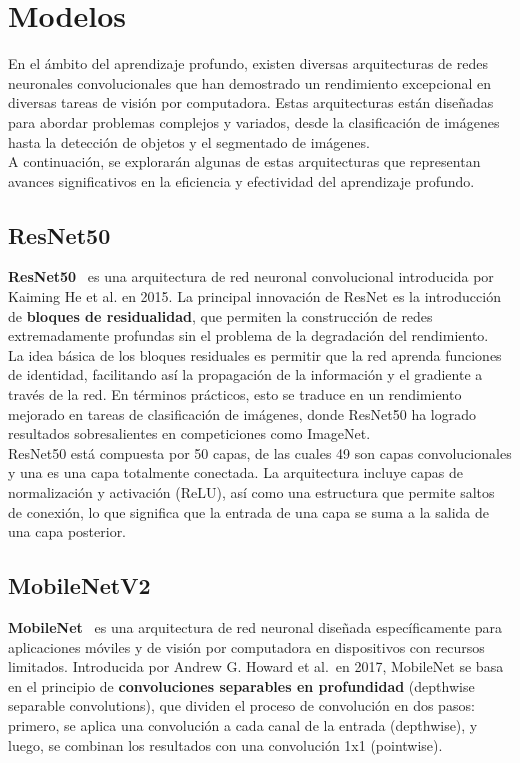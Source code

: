 \section{Modelos}\label{sec:modelos}
En el ámbito del aprendizaje profundo, existen diversas arquitecturas de redes neuronales convolucionales que han
demostrado un rendimiento excepcional en diversas tareas de visión por computadora.
Estas arquitecturas están diseñadas para abordar problemas complejos y variados, desde la clasificación de imágenes
hasta la detección de objetos y el segmentado de imágenes. \\[6pt]

A continuación, se explorarán algunas de estas arquitecturas que representan avances significativos en la eficiencia y
efectividad del aprendizaje profundo.

\subsection{ResNet50}\label{subsec:resnet50}
\textbf{ResNet50}~\cite{resnet} es una arquitectura de red neuronal convolucional introducida por Kaiming He et al. en 2015.
La principal innovación de ResNet es la introducción de \textbf{bloques de residualidad}, que permiten la construcción
de redes extremadamente profundas sin el problema de la degradación del rendimiento. \\[6pt]

La idea básica de los bloques residuales es permitir que la red aprenda funciones de identidad, facilitando así la
propagación de la información y el gradiente a través de la red.
En términos prácticos, esto se traduce en un rendimiento mejorado en tareas de clasificación de imágenes, donde
ResNet50 ha logrado resultados sobresalientes en competiciones como ImageNet. \\[6pt]

ResNet50 está compuesta por 50 capas, de las cuales 49 son capas convolucionales y una es una capa totalmente conectada.
La arquitectura incluye capas de normalización y activación (ReLU), así como una estructura que permite saltos de
conexión, lo que significa que la entrada de una capa se suma a la salida de una capa posterior.

\subsection{MobileNetV2}\label{subsec:mobilenet}
\textbf{MobileNet}~\cite{} es una arquitectura de red neuronal diseñada específicamente para aplicaciones móviles y de visión
por computadora en dispositivos con recursos limitados.
Introducida por Andrew G. Howard et al.\ en 2017, MobileNet se basa en el principio de
\textbf{convoluciones separables en profundidad} (depthwise separable convolutions), que dividen el proceso de
convolución en dos pasos: primero, se aplica una convolución a cada canal de la entrada (depthwise), y luego, se
combinan los resultados con una convolución 1x1 (pointwise). \\[6pt]

